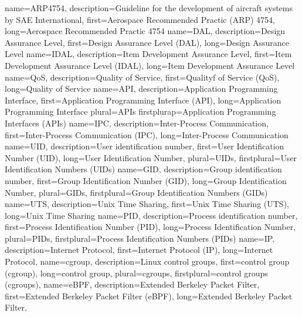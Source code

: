 {%
    name={ARP4754},
    description={Guideline for the development of aircraft systems by SAE International},
    first={Aerospace Recommended Practic (ARP) 4754},
    long={Aerospace Recommended Practic 4754}
}
{%
    name={DAL},
    description={Design Assurance Level},
    first={Design Assurance Level (DAL)},
    long={Design Assurance Level}
}
{%
    name={IDAL},
    description={Item Development Assurance Level},
    first={Item Development Assurance Level (IDAL)},
    long={Item Development Assurance Level}
}
{%
    name={QoS},
    description={Quality of Service},
    first={Qualityf of Service (QoS)},
    long={Quality of Service}
}
{%
    name={API},
    description={Application Programming Interface},
    first={Application Programming Interface (API)},
    long={Application Programming Interface}
    plural={APIs}
    firstplurap={Application Programming Interfaces (APIs)}
}
{%
    name={IPC},
    description={Inter-Process Communication},
    first={Inter-Process Communication (IPC)},
    long={Inter-Process Communication}
}
{%
    name={UID},
    description={User identification number},
    first={User Identification Number (UID)},
    long={User Identification Number},
    plural={UIDs},
    firstplural={User Identification Numbers (UIDs)}
}
{%
    name={GID},
    description={Group identification number},
    first={Group Identification Number (GID)},
    long={Group Identification Number},
    plural={GIDs},
    firstplural={Group Identification Numbers (GIDs)}
}
{%
    name={UTS},
    description={Unix Time Sharing},
    first={Unix Time Sharing (UTS)},
    long={Unix Time Sharing}
}
{%
    name={PID},
    description={Process identification number},
    first={Process Identification Number (PID)},
    long={Process Identification Number},
    plural={PIDs},
    firstplural={Process Identification Numbers (PIDs)}
}
{%
    name={IP},
    description={Internet Protocol},
    first={Internet Protocol (IP)},
    long={Internet Protocol},
}
{%
    name={cgroup},
    description={Linux control groups},
    first={control group (cgroup)},
    long={control group},
    plural={cgroups},
    firstplural={control groups (cgroups)},
}
{%
    name={eBPF},
    description={Extended Berkeley Packet Filter},
    first={Extended Berkeley Packet Filter (eBPF)},
    long={Extended Berkeley Packet Filter},
}
